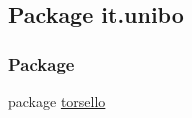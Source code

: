 \hypertarget{namespaceit_1_1unibo}{}\subsection{Package it.\+unibo}
\label{namespaceit_1_1unibo}
\subsubsection*{Package}
\begin{DoxyCompactItemize}
\item 
package \hyperlink{namespaceit_1_1unibo_1_1torsello}{torsello}
\end{DoxyCompactItemize}
